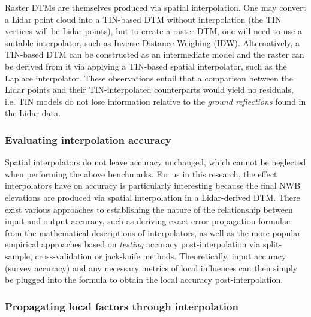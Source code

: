 Raster DTMs are themselves produced via spatial interpolation. One may convert a Lidar point cloud into a TIN-based DTM without interpolation (the TIN vertices will be Lidar points), but to create a raster DTM, one will need to use a suitable interpolator, such as Inverse Distance Weighing (IDW). Alternatively, a TIN-based DTM can be constructed as an intermediate model and the raster can be derived from it via applying a TIN-based spatial interpolator, such as the Laplace interpolator. These observations entail that a comparison between the Lidar points and their TIN-interpolated counterparts would yield no residuals, i.e. TIN models do not lose information relative to the \textit{ground reflections} found in the Lidar data.

\subsubsection{Evaluating interpolation accuracy}

Spatial interpolators do not leave accuracy unchanged, which cannot be neglected when performing the above benchmarks. For us in this research, the effect interpolators have on accuracy is particularly interesting because the final NWB elevations are produced via spatial interpolation in a Lidar-derived DTM. There exist various approaches to establishing the nature of the relationship between input and output accuracy, such as deriving exact error propagation formulae from the mathematical descriptions of interpolators, as well as the more popular empirical approaches based on \textit{testing} accuracy post-interpolation via split-sample, cross-validation or jack-knife methods. Theoretically, input accuracy (survey accuracy) and any necessary metrics of local influences can then simply be plugged into the formula to obtain the local accuracy post-interpolation.

\subsubsection{Propagating local factors through interpolation}


